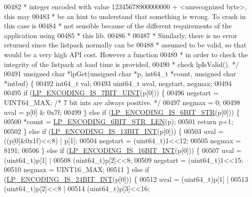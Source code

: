 \begin{DoxyCode}
00482 \textcolor{comment}{ * integer encoded with value 12345678900000000 + <unrecognized byte>, this may}
00483 \textcolor{comment}{ * be an hint to understand that something is wrong. To crash in this case is}
00484 \textcolor{comment}{ * not sensible because of the different requirements of the application using}
00485 \textcolor{comment}{ * this lib.}
00486 \textcolor{comment}{ *}
00487 \textcolor{comment}{ * Similarly, there is no error returned since the listpack normally can be}
00488 \textcolor{comment}{ * assumed to be valid, so that would be a very high API cost. However a function}
00489 \textcolor{comment}{ * in order to check the integrity of the listpack at load time is provided,}
00490 \textcolor{comment}{ * check lpIsValid(). */}
00491 \textcolor{keywordtype}{unsigned} \textcolor{keywordtype}{char} *lpGet(\textcolor{keywordtype}{unsigned} \textcolor{keywordtype}{char} *p, int64\_t *count, \textcolor{keywordtype}{unsigned} \textcolor{keywordtype}{char} *intbuf) \{
00492     int64\_t val;
00493     uint64\_t uval, negstart, negmax;
00494 
00495     \textcolor{keywordflow}{if} (\hyperlink{listpack_8c_a4a6f30f71e802fffc5e9ab4ebf340a85}{LP\_ENCODING\_IS\_7BIT\_UINT}(p[0])) \{
00496         negstart = UINT64\_MAX; \textcolor{comment}{/* 7 bit ints are always positive. */}
00497         negmax = 0;
00498         uval = p[0] & 0x7f;
00499     \} \textcolor{keywordflow}{else} \textcolor{keywordflow}{if} (\hyperlink{listpack_8c_a6d358f2ea07af0f8624dcd6abc784503}{LP\_ENCODING\_IS\_6BIT\_STR}(p[0])) \{
00500         *count = \hyperlink{listpack_8c_aa8f2d59ee3355ef504d3b9914e5bb71d}{LP\_ENCODING\_6BIT\_STR\_LEN}(p);
00501         \textcolor{keywordflow}{return} p+1;
00502     \} \textcolor{keywordflow}{else} \textcolor{keywordflow}{if} (\hyperlink{listpack_8c_a3b3582cd32282a865f4df2c8c7a2aa24}{LP\_ENCODING\_IS\_13BIT\_INT}(p[0])) \{
00503         uval = ((p[0]&0x1f)<<8) | p[1];
00504         negstart = (uint64\_t)1<<12;
00505         negmax = 8191;
00506     \} \textcolor{keywordflow}{else} \textcolor{keywordflow}{if} (\hyperlink{listpack_8c_a95d38c05519efabc4ee56f4562e98750}{LP\_ENCODING\_IS\_16BIT\_INT}(p[0])) \{
00507         uval = (uint64\_t)p[1] |
00508                (uint64\_t)p[2]<<8;
00509         negstart = (uint64\_t)1<<15;
00510         negmax = UINT16\_MAX;
00511     \} \textcolor{keywordflow}{else} \textcolor{keywordflow}{if} (\hyperlink{listpack_8c_a3ab45d5e21a9cb0f43d9fd91d55fad34}{LP\_ENCODING\_IS\_24BIT\_INT}(p[0])) \{
00512         uval = (uint64\_t)p[1] |
00513                (uint64\_t)p[2]<<8 |
00514                (uint64\_t)p[3]<<16;

\end{DoxyCode}
